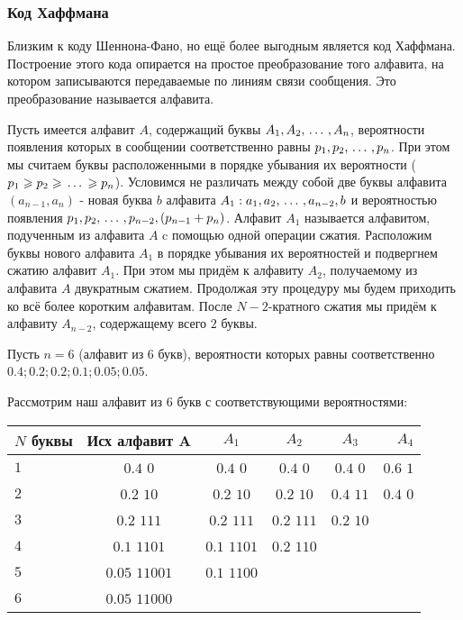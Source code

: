 ﻿\documentclass[a4paper,12pt]{report}
\begin{document}
	\subsubsection{Код Хаффмана}



	Близким к коду Шеннона-Фано, но ещё более выгодным является код Хаффмана. Построение этого кода опирается на простое преобразование того алфавита, на котором записываются передаваемые по линиям связи сообщения. Это преобразование  называется  алфавита. 
	
	Пусть имеется алфавит $A$, содержащий буквы $A_1, A_2, \,\ldots\, ,A_n$, вероятности появления которых в сообщении соответственно равны $p_1, p_2, \,\ldots\, ,p_n$. При этом мы считаем буквы расположенными в порядке убывания их вероятности ($p_1 \geqslant p_2 \geqslant \,\ldots\, \geqslant p_n$). Условимся не различать между собой две  буквы алфавита $(a_{n-1},a_n)$ - новая буква $b$ алфавита $A_1: a_1, a_2, \,\ldots\, ,a_{n-2}, b$ и вероятностью появления $p_1,p_2, \,\ldots\, ,p_{n-2},(p_{n-1}+p_n)$. Алфавит $A_1$ называется алфавитом, подученным из алфавита $A$ c помощью одной операции сжатия. Расположим буквы нового алфавита $A_1$ в порядке убывания их вероятностей и подвергнем сжатию алфавит $A_1$. При этом мы придём к алфавиту $A_2$, получаемому из алфавита $A$ двукратным сжатием. Продолжая эту процедуру мы будем приходить ко всё более коротким алфавитам. После $N-2$-кратного сжатия мы придём к алфавиту $A_{n-2}$, содержащему всего $2$ буквы.
	
	 Пусть $n=6$ (алфавит из $6$ букв), вероятности которых равны соответственно $0.4;0.2;0.2;0.1;0.05;0.05$.
	
	Рассмотрим наш алфавит из 6 букв с соответствующими вероятностями:
	
	\begin{tabular}{|l|c|c|c|c|r|}
	\hline				%
	$N$ буквы & Исх алфавит A   & $A_1$ & $A_2$ & $A_3$  & $A_4$ \\
	\hline
	$1$ & $0.4$ $0$      & $0.4$ $0$    & $0.4$ $0$   & $0.4$ $0$  & $0.6$ $1$\\
	\hline                                                        %
	$2$ & $0.2$ $10$     & $0.2$ $10$   & $0.2$ $10$  & $0.4$ $11$ & $0.4$ $0$ \\
	\hline                             %
	$3$ & $0.2$ $111$    & $0.2$ $111$  & $0.2$ $111$ & $0.2$ $10$ &  \\
	\hline                             %
	$4$ & $0.1$ $1101$   & $0.1$ $1101$ & $0.2$ $110$ &  &  \\
	\hline                             %
	$5$ & $0.05$ $11001$ & $0.1$ $1100$ &  &  &  \\
	\hline              %
	$6$ & $0.05$ $11000$ &  &  &  &  \\
	\hline
	\end{tabular}
	
\end{document}
